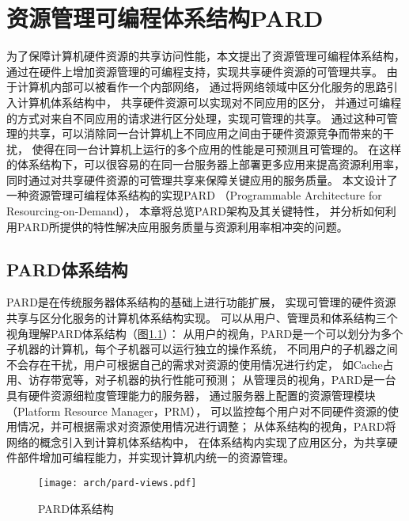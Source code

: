 

\chapter{资源管理可编程体系结构PARD}
\label{chap:pardarch}

为了保障计算机硬件资源的共享访问性能，本文提出了资源管理可编程体系结构，
通过在硬件上增加资源管理的可编程支持，实现共享硬件资源的可管理共享。
由于计算机内部可以被看作一个内部网络，
通过将网络领域中区分化服务的思路引入计算机体系结构中，
共享硬件资源可以实现对不同应用的区分，
并通过可编程的方式对来自不同应用的请求进行区分处理，实现可管理的共享。
通过这种可管理的共享，可以消除同一台计算机上不同应用之间由于硬件资源竞争而带来的干扰，
使得在同一台计算机上运行的多个应用的性能是可预测且可管理的。
在这样的体系结构下，可以很容易的在同一台服务器上部署更多应用来提高资源利用率，
同时通过对共享硬件资源的可管理共享来保障关键应用的服务质量。
本文设计了一种资源管理可编程体系结构的实现PARD
（Programmable Architecture for Resourcing-on-Demand）\cite{pard2015}，
本章将总览PARD架构及其关键特性，
并分析如何利用PARD所提供的特性解决应用服务质量与资源利用率相冲突的问题。


\section{PARD体系结构}

PARD是在传统服务器体系结构的基础上进行功能扩展，
实现可管理的硬件资源共享与区分化服务的计算机体系结构实现。
可以从用户、管理员和体系结构三个视角理解PARD体系结构（图\ref{fig:pard-views}）：
从用户的视角，PARD是一个可以划分为多个子机器的计算机，每个子机器可以运行独立的操作系统，
不同用户的子机器之间不会存在干扰，用户可根据自己的需求对资源的使用情况进行约定，
如Cache占用、访存带宽等，对子机器的执行性能可预测；
从管理员的视角，PARD是一台具有硬件资源细粒度管理能力的服务器，
通过服务器上配置的资源管理模块（Platform Resource Manager，PRM），
可以监控每个用户对不同硬件资源的使用情况，并可根据需求对资源使用情况进行调整；
从体系结构的视角，PARD将网络的概念引入到计算机体系结构中，
在体系结构内实现了应用区分，为共享硬件部件增加可编程能力，并实现计算机内统一的资源管理。

\begin{figure}[t]
  \centering
  \texttt{[image: arch/pard-views.pdf]}
  \caption{PARD体系结构}
  \label{fig:pard-views}
\end{figure}

